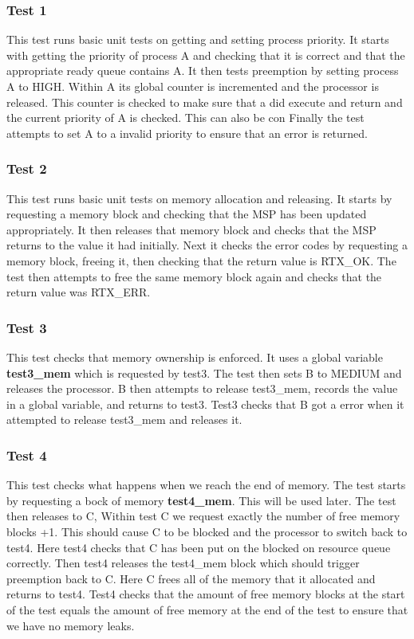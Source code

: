 \documentclass[11pt, oneside]{article}
\begin{document}
\subsubsection{Test 1}
This test runs basic unit tests on getting and setting process priority. It starts with getting the priority of process A and checking that it is correct and that the appropriate ready queue contains A. It then tests preemption by setting process A to HIGH. Within A its global counter is incremented and the processor is released. This counter is checked to make sure that a did execute and return and the current priority of A is checked. This can also be con Finally the test attempts to set A to a invalid priority to ensure that an error is returned.
\subsubsection{Test 2}
This test runs basic unit tests on memory allocation and releasing. It starts by requesting a memory block and checking that the MSP has been updated appropriately. It then releases that memory block and checks that the MSP returns to the value it had initially. Next it checks the error codes by requesting a memory block, freeing it, then checking that the return value is RTX\_OK. The test then attempts to free the same memory block again and checks that the return value was RTX\_ERR.
\subsubsection{Test 3}
This test checks that memory ownership is enforced. It uses a global variable \textbf{test3\_mem} which is requested by test3. The test then sets B to MEDIUM and releases the processor. B then attempts to release test3\_mem, records the value in a global variable, and returns to test3. Test3 checks that B got a error when it attempted to release test3\_mem and releases it.
\subsubsection{Test 4}
This test checks what happens when we reach the end of memory. The test starts by requesting a bock of memory \textbf{test4\_mem}. This will be used later. The test then releases to C, Within test C we request exactly the number of free memory blocks +1. This should cause C to be blocked and the processor to switch back to test4. Here test4 checks that C has been put on the blocked on resource queue correctly. Then test4 releases the test4\_mem block which should trigger preemption back to C. Here C frees all of the memory that it allocated and returns to test4. Test4 checks that the amount of free memory blocks at the start of the test equals the amount of free memory at the end of the test to ensure that we have no memory leaks.
\end{document}
